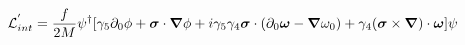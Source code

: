 \begin{equation}
{\cal L}_{int}^{'} = \frac{f}{2M} \psi^{\dag} [\gamma_{5} \partial_{0} \phi
+ \mbox{\boldmath $\sigma$} \cdot \mbox{\boldmath $\nabla$} \phi + i \gamma_{5} \gamma_{4} 
\mbox{\boldmath $\sigma$} \cdot
(\partial_{0} \mbox{\boldmath $\omega$} - \mbox{\boldmath $\nabla$} \omega_{0})+ \gamma_{4} 
(\mbox{\boldmath $\sigma$} \times \mbox{\boldmath $\nabla$}) \cdot \mbox{\boldmath $\omega$}] \psi 
\end{equation}

